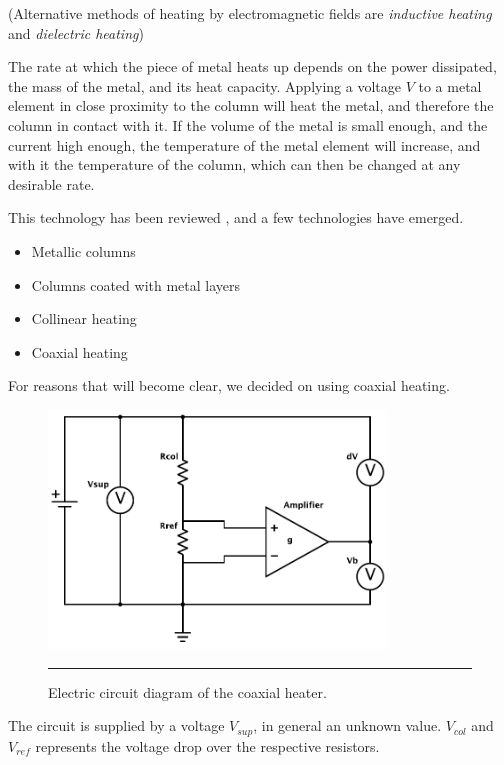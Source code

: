 (Alternative methods of heating by electromagnetic fields are \textit{inductive
heating} and \textit{dielectric heating})

The rate at which the piece of metal heats up depends on the power dissipated,
the mass of the metal, and its heat capacity. Applying a voltage $V$ to a metal
element in close proximity to the column will heat the metal, and therefore the
column in contact with it. If the volume of the metal is small enough, and the
current high enough, the temperature of the metal element will increase, and
with it the temperature of the column, which can then be changed at any
desirable rate.

This technology has been reviewed , and
a few technologies have emerged.

\begin{itemize}
  \item Metallic columns 
  \item Columns coated with metal layers
  \item Collinear heating
  \item Coaxial heating
\end{itemize}

For reasons that will become clear, we decided on using coaxial heating. 

\begin{figure}[htbp]
	\centering
	\includegraphics[width=0.8\textwidth,natwidth=4.17in,natheight=3.32in]{Figures/Column-Heater.pdf}
	\rule{35em}{0.5pt}
	\caption[Coaxial heater resistance heater]{Electric circuit diagram of the coaxial heater.}
	\label{fig:HeaterDiagram}
\end{figure}

The circuit is supplied by a voltage $V_{sup}$, in general an unknown value.
$V_{col}$ and $V_{ref}$ represents the voltage drop over the respective
resistors.

